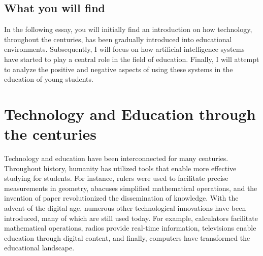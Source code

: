 \documentclass[a4paper,12pt]{article}
\begin{document}
\subsection{What you will find}
In the following essay, you will initially find an introduction on how technology, throughout the centuries, has been gradually introduced into educational environments. Subsequently, I will focus on how artificial intelligence systems have started to play a central role in the field of education. Finally, I will attempt to analyze the positive and negative aspects of using these systems in the education of young students.

\section{Technology and Education through the centuries}
Technology and education have been interconnected for many centuries. Throughout history, humanity has utilized tools that enable more effective studying for students. For instance, rulers were used to facilitate precise measurements in geometry, abacuses simplified mathematical operations, and the invention of paper revolutionized the dissemination of knowledge. With the advent of the digital age, numerous other technological innovations have been introduced, many of which are still used today. For example, calculators facilitate mathematical operations, radios provide real-time information, televisions enable education through digital content, and finally, computers have transformed the educational landscape.

\end{document}
